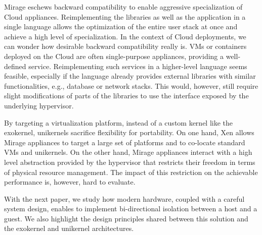 Mirage eschews backward compatibility to enable aggressive specialization of Cloud appliances.
Reimplementing the libraries as well as the application in a single language allows the optimization of the entire user stack at once and achieve a high level of specialization.
In the context of Cloud deployments, we can wonder how desirable backward compatibility really is.
VMs or containers deployed on the Cloud are often single-purpose appliances, providing a well-defined service.
Reimplementing such services in a higher-level language seems feasible, especially if the language already provides external libraries with similar functionalities, e.g., database or network stacks.
This would, however, still require slight modifications of parts of the libraries to use the interface exposed by the underlying hypervisor.

By targeting a virtualization platform, instead of a custom kernel like the exokernel, unikernels sacrifice flexibility for portability.
On one hand, Xen allows Mirage appliances to target a large set of platforms and to co-locate standard VMs and unikernels.
On the other hand, Mirage appliances interact with a high level abstraction provided by the hypervisor that restricts their freedom in terms of physical resource management.
The impact of this restriction on the achievable performance is, however, hard to evaluate.

With the next paper, we study how modern hardware, coupled with a careful system design, enables to implement bi-directional isolation between a host and a guest.
We also highlight the design principles shared between this solution and the exokernel and unikernel architectures.


